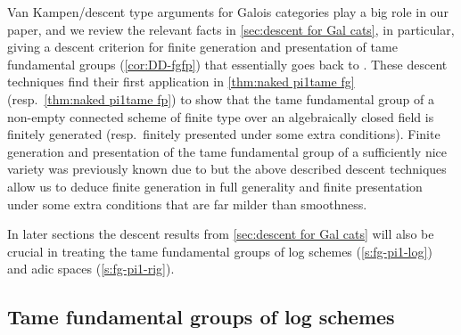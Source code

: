 Van Kampen/descent type arguments for Galois categories play a big role in our paper, and we review the relevant facts in \cref{sec:descent for Gal cats}, in particular, giving a descent criterion for finite generation and presentation of tame fundamental groups (\cref{cor:DD-fgfp}) that essentially goes back to \cite[IX, \S5]{SGA1}. 
These descent techniques find their first application in \cref{thm:naked pi1tame fg} (resp.~\cref{thm:naked pi1tame fp}) to show that the tame fundamental group of a non-empty connected scheme of finite type over an algebraically closed field is finitely generated (resp.~finitely presented under some extra conditions).
Finite generation and presentation of the tame fundamental group of a sufficiently nice variety was previously known due to \cite{EsnaultShustermanSrinivas2022:FinitePresentationTame} but the above described descent techniques allow us to deduce finite generation in full generality and finite presentation under some extra conditions that are far milder than smoothness.

In later sections the descent results from \cref{sec:descent for Gal cats} will also be crucial in treating the tame fundamental groups of log schemes (\cref{s:fg-pi1-log}) and adic spaces (\cref{s:fg-pi1-rig}).

\subsection*{Tame fundamental groups of log schemes}

